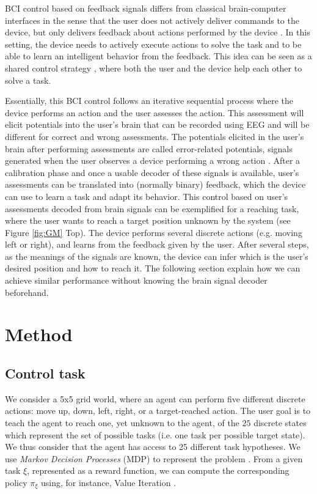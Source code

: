 BCI control based on feedback signals differs from classical brain-computer interfaces in the sense that the user does not actively deliver commands to the device, but only delivers feedback about actions performed by the device \cite{chavarriaga2010learning,iturrate13}. In this setting, the device needs to actively execute actions to solve the task and to be able to learn an intelligent behavior from the feedback. This idea can be seen as a shared control strategy \cite{millan10}, where both the user and the device help each other to solve a task.

Essentially, this BCI control follows an iterative sequential process where the device performs an action and the user assesses the action. This assessment will elicit potentials into the user's brain that can be recorded using EEG and will be different for correct and wrong assessments. The potentials elicited in the user's brain after performing assessments are called error-related potentials, signals generated when the user observes a device performing a wrong action \cite{FerrezErrores}. After a calibration phase and once a usable decoder of these signals is available, user's assessments can be translated into (normally binary) feedback, which the device can use to learn a task and adapt its behavior. 
%
This control based on user's assessments decoded from brain signals can be exemplified for a reaching task, where the user wants to reach a target position unknown by the system (see Figure \ref{fig:GM} Top). The device performs several discrete actions (e.g. moving left or right), and learns from the feedback given by the user. After several steps, as the meanings of the signals are known, the device can infer which is the user's desired position and how to reach it. The following section explain how we can achieve similar performance without knowing the brain signal decoder beforehand.

\section{Method}


\subsection{Control task}
We consider a 5x5 grid world, where an agent can perform five different discrete actions: move up, down, left, right, or a target-reached action. The user goal is to teach the agent to reach one, yet unknown to the agent, of the $25$ discrete states which represent the set of possible tasks (i.e. one task per possible target state). We thus consider that the agent has access to 25 different task hypotheses. We use \textit{Markov Decision Processes} (MDP) to represent the problem \cite{sutton1998reinforcement}. From a given task $\xi$, represented as a reward function, we can compute the corresponding policy $\pi_{\xi}$ using, for instance, Value Iteration \cite{sutton1998reinforcement}. 

